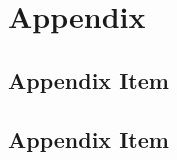 \section{Appendix}

\renewcommand{\thesubsection}{\Alph{subsection}}
\renewcommand{\thefigure}{\Alph{subsection}.\arabic{figure}}

\subsection{Appendix Item}

\clearpage

\subsection{Appendix Item}